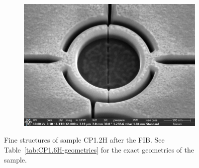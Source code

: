 \begin{figure}[ht!]
	\hfill
	\begin{subfigure}[t]{0.3\textwidth}
		\centering
		\includegraphics[width=\textwidth]{figures/samples/CP1/CP1.2H_SEM_SQUID.jpg}
	\end{subfigure}

	\caption{Fine structures of sample CP1.2H after the FIB. See Table~\ref{tab:CP1.6H-geometries} for the exact geometries of the sample.}
	\label{fig:CP1.2H-SEM-images}
\end{figure}

